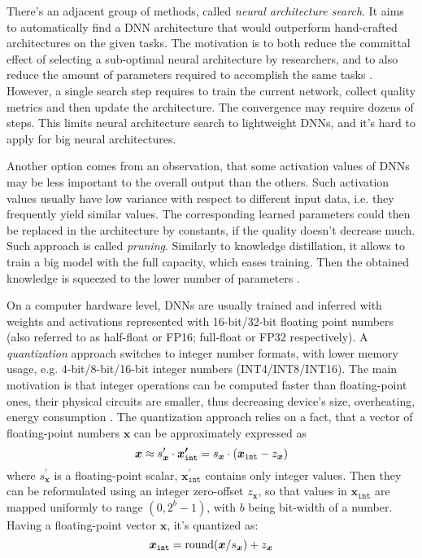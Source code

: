 There's an adjacent group of methods, called \textit{neural architecture search}. It aims to automatically find a DNN architecture that would outperform hand-crafted architectures on the given tasks. The motivation is to both reduce the committal effect of selecting a sub-optimal neural architecture by researchers, and to also reduce the amount of parameters required to accomplish the same tasks \cite{survey:neural-arch-search19, dnn:eff-neural-arch-search18}. However, a single search step requires to train the current network, collect quality metrics and then update the architecture. The convergence may require dozens of steps. This limits neural architecture search to lightweight DNNs, and it's hard to apply for big neural architectures.

Another option comes from an observation, that some activation values of DNNs may be less important to the overall output than the others. Such activation values usually have low variance with respect to different input data, i.e. they frequently yield similar values. The corresponding learned parameters could then be replaced in the architecture by constants, if the quality doesn't decrease much. Such approach is called \textit{pruning}. Similarly to knowledge distillation, it allows to train a big model with the full capacity, which eases training. Then the obtained knowledge is squeezed to the lower number of parameters  \cite{method:pruning16, survey:pruning20, speed:prunning-gan21}.

On a computer hardware level, DNNs are usually trained and inferred with weights and activations represented with 16-bit/32-bit floating point numbers (also referred to as half-float or FP16; full-float or FP32 respectively). A \textit{quantization} approach switches to integer number formats, with lower memory usage, e.g. 4-bit/8-bit/16-bit integer numbers (INT4/INT8/INT16). The main motivation is that integer operations can be computed faster than floating-point ones, their physical circuits are smaller, thus decreasing device's size, overheating, energy consumption \cite{aux:fp-int-speed10}. The quantization approach relies on a fact, that a vector of floating-point numbers $\bm{x}$ can be approximately expressed as 
\begin{equation}
	\setlength\abovedisplayskip{0pt}
	\bm{x} \approx s^\prime_{\bm{x}} \cdot \bm{x^\prime_{\mathtt{int}}} = s_{\bm{x}} \cdot (\bm{x_{\mathtt{int}}} - z_{\bm{x}})
	\setlength\belowdisplayskip{0pt}
\end{equation} where $s^\prime_{\bm{x}}$ is a floating-point scalar, $\bm{x^\prime_{\mathtt{int}}}$ contains only integer values. Then they can be reformulated using an integer zero-offset $z_{\bm{x}}$, so that values in $\bm{x_{\mathtt{int}}}$ are mapped uniformly to range $(0, 2^b-1)$, with $b$ being bit-width of a number. Having a floating-point vector $\bm{x}$, it's quantized as:  
\begin{equation}
	\setlength\abovedisplayskip{0pt}
	\bm{x_{\mathtt{int}}} = \text{round}(\bm{x}/s_{\bm{x}}) + z_{\bm{x}}
	\setlength\belowdisplayskip{0pt}
\end{equation}

